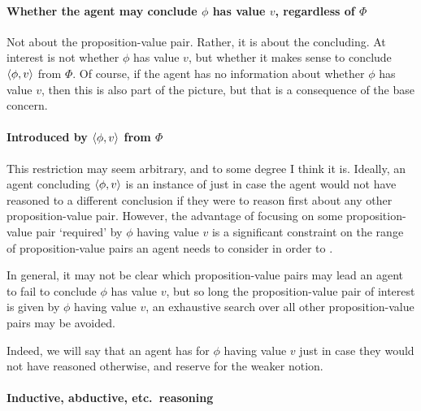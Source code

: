 \paragraph*{Whether the agent may conclude \(\phi\) has value \(v\), regardless of \(\Phi\)}

\begin{note}
  Not about the proposition-value pair.
  Rather, it is about the concluding.
  At interest is not whether \(\phi\) has value \(v\), but whether it makes sense to conclude \(\langle \phi, v \rangle\) from \(\Phi\).
  Of course, if the agent has no information about whether \(\phi\) has value \(v\), then this is also part of the picture, but that is a consequence of the base concern.
\end{note}

\paragraph*{Introduced by \(\langle \phi, v \rangle\) from \(\Phi\)}

\begin{note}
  This restriction may seem arbitrary, and to some degree I think it is.
  Ideally, an agent concluding \(\langle \phi, v \rangle\) is an instance of \csN{} just in case the agent would not have reasoned to a different conclusion if they were to reason first about any other proposition-value pair.
  However, the advantage of focusing on some proposition-value pair `required' by \(\phi\) having value \(v\) is a significant constraint on the range of proposition-value pairs an agent needs to consider in order to \csN{}.

  In general, it may not be clear which proposition-value pairs may lead an agent to fail to conclude \(\phi\) has value \(v\), but so long the proposition-value pair of interest is given by \(\phi\) having value \(v\), an exhaustive search over all other proposition-value pairs may be avoided.

  Indeed, we will say that an agent has \emph{\support{}} for \(\phi\) having value \(v\) just in case they would not have reasoned otherwise, and reserve \emph{\claiming{}} \support{} for the weaker notion.
\end{note}


\paragraph*{Inductive, abductive, etc.\ reasoning}

